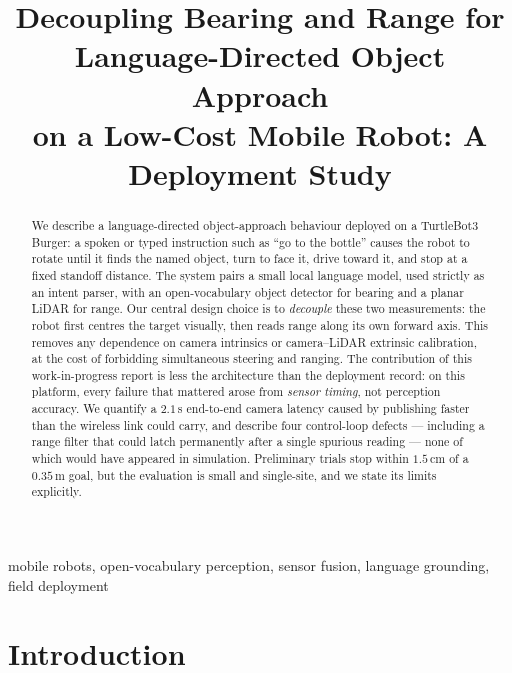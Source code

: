 \documentclass[conference]{IEEEtran}
\begin{document}
\title{Decoupling Bearing and Range for Language-Directed Object Approach\\
on a Low-Cost Mobile Robot: A Deployment Study\\
\large{}}

\author{
}

\maketitle

\begin{abstract}
We describe a language-directed object-approach behaviour deployed on a
TurtleBot3 Burger: a spoken or typed instruction such as ``go to the bottle''
causes the robot to rotate until it finds the named object, turn to face it,
drive toward it, and stop at a fixed standoff distance. The system pairs a
small local language model, used strictly as an intent parser, with an
open-vocabulary object detector for bearing and a planar LiDAR for range. Our
central design choice is to \emph{decouple} these two measurements: the robot
first centres the target visually, then reads range along its own forward axis.
This removes any dependence on camera intrinsics or camera--LiDAR extrinsic
calibration, at the cost of forbidding simultaneous steering and ranging.
The contribution of this work-in-progress report is less the architecture than
the deployment record: on this platform, every failure that mattered arose from
\emph{sensor timing}, not perception accuracy. We quantify a $2.1$\,s
end-to-end camera latency caused by publishing faster than the wireless link
could carry, and describe four control-loop defects --- including a range
filter that could latch permanently after a single spurious reading --- none of
which would have appeared in simulation. Preliminary trials stop within
$1.5$\,cm of a $0.35$\,m goal, but the evaluation is small and single-site, and
we state its limits explicitly.
\end{abstract}

\begin{IEEEkeywords}
mobile robots, open-vocabulary perception, sensor fusion, language grounding,
field deployment
\end{IEEEkeywords}

\section{Introduction}
\end{document}
